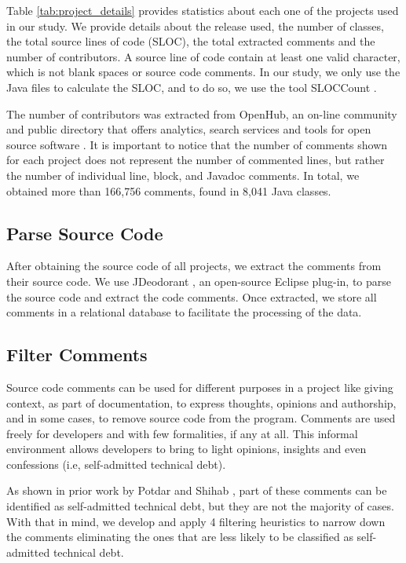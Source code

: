 Table \ref{tab:project_details} provides statistics about each one of the projects used in our study. We provide details about the release used, the number of classes, the total source lines of code (SLOC), the total extracted comments and the number of contributors. A source line of code contain at least one valid character, which is not blank spaces or source code comments. In our study, we only use the Java files to calculate the SLOC, and to do so, we use the tool SLOCCount \cite{wheeler2004:home}. 

The number of contributors was extracted from OpenHub, an on-line community and public directory that offers analytics, search services and tools for open source software \cite{Openhub:home}. It is important to notice that the number of comments shown for each project does not represent the number of commented lines, but rather the number of individual line, block, and Javadoc comments. In total, we obtained more than 166,756 comments, found in 8,041 Java classes.
 
\subsection{Parse Source Code} %
\label{sub:parse_source_code}
After obtaining the source code of all projects, we extract the comments from their source code. We use JDeodorant \cite{Tsantalis2008CSMR}, an open-source Eclipse plug-in, to parse the source code and extract the code comments. Once extracted, we store all comments in a relational database to facilitate the processing of the data.

\subsection{Filter Comments} %
\label{sub:filter_comments}

Source code comments can be used for different purposes in a project like giving context, as part of documentation, to express thoughts, opinions and authorship, and in some cases, to remove source code from the program. Comments are used freely for developers and with few formalities, if any at all. This informal environment allows developers to bring to light opinions, insights and even confessions (i.e, self-admitted technical debt). 

As shown in prior work by Potdar and Shihab \cite{Potdar2014ICSME}, part of these comments can be identified as self-admitted technical debt, but they are not the majority of cases. With that in mind, we develop and apply 4 filtering heuristics to narrow down the comments eliminating the ones that are less likely to be classified as self-admitted technical debt.

